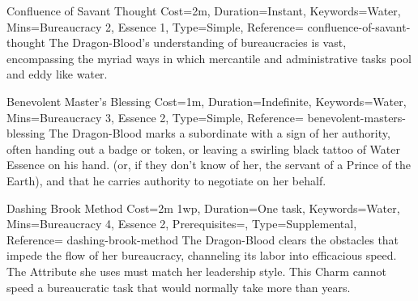 \begin{Charm}{Confluence of Savant Thought}{%
    Cost=2m,
    Duration=Instant,
    Keywords=Water,
    Mins={Bureaucracy 2, Essence 1},
    Type=Simple,
    Reference=\cite*[p.~181]{db}
}{confluence-of-savant-thought}
    The Dragon-Blood's understanding of bureaucracies is vast, encompassing the
    myriad ways in which mercantile and administrative tasks pool and eddy like
    water. 
\end{Charm}


\begin{Charm}{Benevolent Master's Blessing}{%
    Cost=1m,
    Duration=Indefinite,
    Keywords=Water,
    Mins={Bureaucracy 3, Essence 2},
    Type=Simple,
    Reference=\cite*[p.~181]{db}
}{benevolent-masters-blessing}
    The Dragon-Blood marks a subordinate with a sign of her authority, often
    handing out a badge or token, or leaving a swirling black tattoo of Water
    Essence on his hand.  (or, if
    they don't know of her, the servant of a Prince of the Earth), and that he
    carries authority to negotiate on her behalf. 
\end{Charm}


\begin{Charm}{Dashing Brook Method}{%
    Cost=2m 1wp,
    Duration=One task,
    Keywords=Water,
    Mins={Bureaucracy 4, Essence 2},
    Prerequisites=,
    Type=Supplemental,
    Reference=\cite*[p.~182]{db}
}{dashing-brook-method}
    The Dragon-Blood clears the obstacles that impede the flow of her
    bureaucracy, channeling its labor into efficacious speed.  The Attribute she uses must match her
    leadership style. This Charm cannot speed a bureaucratic task that would
    normally take more than  years.
\end{Charm}



